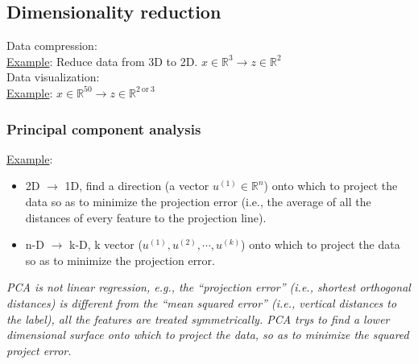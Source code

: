 %
\subsection{Dimensionality reduction}
Data compression:\\
\underline{Example}: Reduce data from 3D to 2D. $x \in \mathbb{R}^3 \rightarrow z \in \mathbb{R}^2$\\
Data visualization:\\
\underline{Example}: $x \in \mathbb{R}^{50} \rightarrow z \in \mathbb{R}^{2 ~ \text{or} ~ 3}$

\subsubsection{Principal component analysis}
\underline{Example}: 
\begin{itemize}
\item
2D $\rightarrow$ 1D, find a direction (a vector $u^{(1)} \in \mathbb{R}^n$) onto which to project the data so as to minimize the projection error (i.e., the average of all the distances of every feature to the projection line).
\item
n-D $\rightarrow$ k-D, k vector ($u^{(1)}, u^{(2)}, \cdots, u^{(k)}$) onto which to project the data so as to minimize the projection error.
\end{itemize}

\emph{\textcolor{Bittersweet}{PCA is not linear regression, e.g., the ``projection error'' (i.e., shortest orthogonal distances) is different from the ``mean squared error'' (i.e., vertical distances to the label), all the features are treated symmetrically. PCA trys to find a lower dimensional surface onto which to project the data, so as to minimize the squared project error.}}

